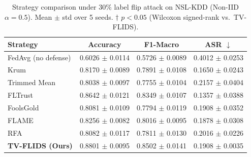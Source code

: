 \begin{table}[t]
\centering
\caption{Strategy comparison under 30\% label flip attack on NSL-KDD (Non-IID $\alpha=0.5$). Mean $\pm$ std over 5 seeds. $\dagger$ $p < 0.05$ (Wilcoxon signed-rank vs.~TV-FLIDS).}
\label{tab:main_results}
\begin{tabular}{lccc}
\toprule
Strategy & Accuracy & F1-Macro & ASR $\downarrow$ \\
\midrule
FedAvg (no defense) & 0.6026 $\pm$ 0.0114 & 0.5726 $\pm$ 0.0089 & 0.4012 $\pm$ 0.0253 \\
Krum \cite{blanchard2017nips} & 0.8170 $\pm$ 0.0089 & 0.7891 $\pm$ 0.0108 & 0.1650 $\pm$ 0.0243 \\
Trimmed Mean \cite{yin2018icml} & 0.8038 $\pm$ 0.0097 & 0.7755 $\pm$ 0.0104 & 0.2157 $\pm$ 0.0404 \\
FLTrust \cite{cao2021fltrust} & 0.8642 $\pm$ 0.0121 & 0.8349 $\pm$ 0.0107 & 0.1357 $\pm$ 0.0388 \\
FoolsGold \cite{fung2018foolsgold} & 0.8081 $\pm$ 0.0109 & 0.7794 $\pm$ 0.0119 & 0.1908 $\pm$ 0.0352 \\
FLAME \cite{nguyen2022flame} & 0.8256 $\pm$ 0.0082 & 0.8016 $\pm$ 0.0095 & 0.1878 $\pm$ 0.0308 \\
RFA \cite{pillutla2022rfa} & 0.8082 $\pm$ 0.0117 & 0.7811 $\pm$ 0.0130 & 0.2016 $\pm$ 0.0226 \\
\midrule
\textbf{TV-FLIDS (Ours)} & 0.8801 $\pm$ 0.0095 & 0.8502 $\pm$ 0.0141 & 0.1908 $\pm$ 0.0035 \\
\bottomrule
\end{tabular}
\end{table}